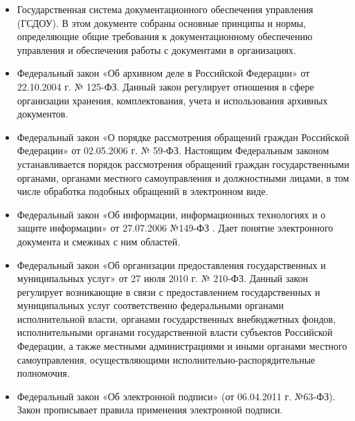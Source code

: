 \begin{itemize}
\item Государственная система документационного обеспечения управления (ГСДОУ). В этом документе собраны основные принципы и нормы, определяющие общие требования к документационному обеспечению управления и обеспечения работы с документами в организациях.

\item Федеральный закон «Об архивном деле в Российской Федерации» от 22.10.2004 г. № 125-ФЗ. Данный закон регулирует отношения в сфере организации хранения, комплектования, учета и использования архивных документов.

\item Федеральный закон «О порядке рассмотрения обращений граждан Российской Федерации» от 02.05.2006 г. № 59-ФЗ. Настоящим Федеральным законом устанавливается порядок рассмотрения обращений граждан государственными органами, органами местного самоуправления и должностными лицами, в том числе обработка подобных обращений в электронном виде.

\item Федеральный закон «Об информации, информационных технологиях и о защите информации» от 27.07.2006 №149-ФЗ . Дает понятие электронного документа и смежных с ним областей.

\item Федеральный закон «Об организации предоставления государственных и муниципальных услуг» от 27 июля 2010 г. № 210-ФЗ. Данный закон регулирует возникающие в связи с предоставлением государственных и муниципальных услуг соответственно федеральными органами исполнительной власти, органами государственных внебюджетных фондов, исполнительными органами государственной власти субъектов Российской Федерации, а также местными администрациями и иными органами местного самоуправления, осуществляющими исполнительно-распорядительные полномочия.

\item Федеральный закон «Об электронной подписи» (от 06.04.2011 г. №63-ФЗ). Закон прописывает правила применения электронной подписи.

\end{itemize}


